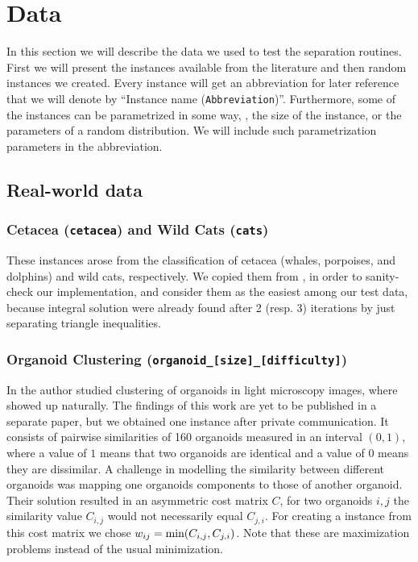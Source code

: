 \section{Data}\label{sec:data}
In this section we will describe the data we used to test the separation routines.
First we will present the instances available from the literature and then random instances we created.
Every instance will get an abbreviation for later reference that we will denote by “Instance name (\texttt{Abbreviation})”.
Furthermore, some of the instances can be parametrized in some way, \eg, the size of the instance, or the parameters of a random distribution.
We will include such parametrization parameters in the abbreviation.

\subsection{Real-world data}
\subsubsection{Cetacea (\texttt{cetacea}) and Wild Cats (\texttt{cats})}\label{subsubsec:data_cetacea}
These instances arose from the classification of cetacea (whales, porpoises, and dolphins) and wild cats, respectively.
We copied them from \cite{grotschelCuttingPlaneAlgorithm1989}, in order to sanity-check our implementation,
and consider them as the easiest among our test data, because integral solution were already found after 2 (resp. 3) iterations by just separating triangle inequalities.

\subsubsection{Organoid Clustering (\texttt{organoid\_[size]\_[difficulty]})}
In \cite{presbergerSegmentationClusteringOrganoids2023} the author studied clustering of organoids in light microscopy images, where \CP showed up naturally.
The findings of this work are yet to be published in a separate paper, but we obtained one instance after private communication.
It consists of pairwise similarities of 160 organoids measured in an interval $(0,1)$, where a value of $1$ means that two organoids are identical and a value of $0$ means they are dissimilar.
A challenge in modelling the similarity between different organoids was mapping one organoids components to those of another organoid.
Their solution resulted in an asymmetric cost matrix $C$, \ie for two organoids $i, j$ the similarity value $C_{i,j}$ would not necessarily equal $C_{j,i}$.
For creating a \CP instance from this cost matrix we chose $w_{ij} = \operatorname{\text{min}}(C_{i,j}, C_{j,i})$.
Note that these are maximization problems instead of the usual minimization.

